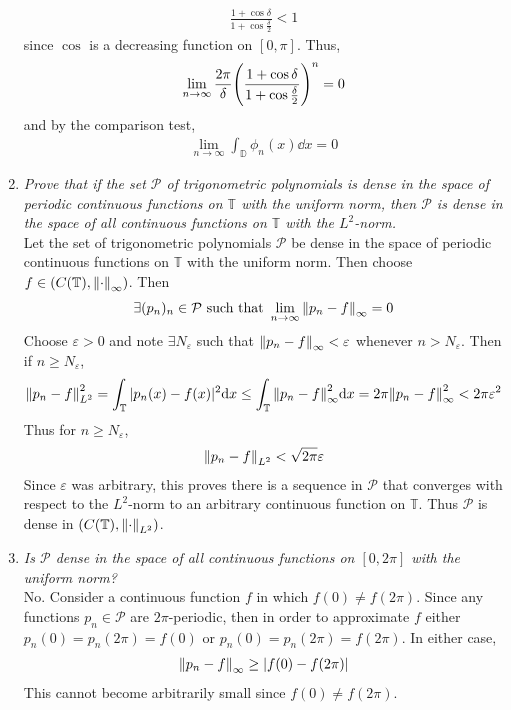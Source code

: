 \documentclass[fontsize=11pt]{article} %
\theoremstyle{plain}
\newcommand{\E}{\varepsilon}
\numberwithin{equation}{section} %
\numberwithin{figure}{section} %
\numberwithin{table}{section} %
\begin{document}
\begin{enumerate}[\bf (a)]
\begin{align*}
            \frac{1 + \cos \delta}{1 + \cos \frac{\delta}{2}} < 1
        \end{align*}
        since $\cos$ is a decreasing function on $[0, \pi]$.  Thus,
        \begin{align*}
            \lim_{n\rightarrow \infty}\frac{2\pi}{\delta}\qty(\frac{1 + \cos \delta}{1 + \cos \frac{\delta}{2}})^n = 0
        \end{align*}
        and by the comparison test,
        \begin{align*}
            \lim_{n\rightarrow \infty}\int_\mathbb{D}\phi_n(x) \dd x = 0
        \end{align*}
    \item
        \emph{Prove that if the set $\mathcal{P}$ of trigonometric polynomials is dense in the space of periodic continuous functions on $\mathbb{T}$ with the uniform norm, then $\mathcal{P}$ is dense in the space of all continuous functions on $\mathbb{T}$ with the $L^2$-norm.} \\

        Let the set of trigonometric polynomials $\mathcal{P}$ be dense in the space of periodic continuous functions on $\mathbb{T}$ with the uniform norm.  Then choose $f \in \qty(C(\mathbb{T}), \norm{\cdot}_\infty)$.  Then
        \begin{align*}
            \exists (p_n)_n \in \mathcal{P} \text{ such that } \lim_{n\rightarrow \infty}\norm{p_n - f}_\infty = 0
        \end{align*}
        Choose $\E > 0$ and note $\exists N_\E$ such that $\norm{p_n - f}_\infty < \E$ whenever $n > N_\E$.  Then if $n \geq N_\E$,
        \begin{align*}
            \norm{p_n - f}_{L^2}^2 = \int_\mathbb{T}|p_n(x) - f(x)|^2\dd x \leq \int_\mathbb{T}\norm{p_n - f}_\infty^2\dd x = 2\pi\norm{p_n - f}_\infty^2 < 2\pi\E^2
        \end{align*}
        Thus for $n \geq N_\E$,
        \begin{align*}
            \norm{p_n - f}_{L^2} < \sqrt{2\pi}\E
        \end{align*}
        Since $\E$ was arbitrary, this proves there is a sequence in $\mathcal{P}$ that converges with respect to the $L^2$-norm to an arbitrary continuous function on $\mathbb{T}$.  Thus $\mathcal{P}$ is dense in $\qty(C(\mathbb{T}), \norm{\cdot}_{L^2})$.
    \item
        \emph{Is $\mathcal{P}$ dense in the space of all continuous functions on $[0, 2\pi]$ with the uniform norm?} \\

        No.  Consider a continuous function $f$ in which $f(0) \neq f(2\pi)$.  Since any functions $p_n \in \mathcal{P}$ are $2\pi$-periodic, then in order to approximate $f$ either $p_n(0) = p_n(2\pi) = f(0)$ or $p_n(0) = p_n(2\pi) = f(2\pi)$.  In either case,
        \begin{align*}
            \norm{p_n - f}_\infty \geq |f(0) - f(2\pi)|
        \end{align*}
        This cannot become arbitrarily small since $f(0) \neq f(2\pi)$.
\end{enumerate}
\end{document}
